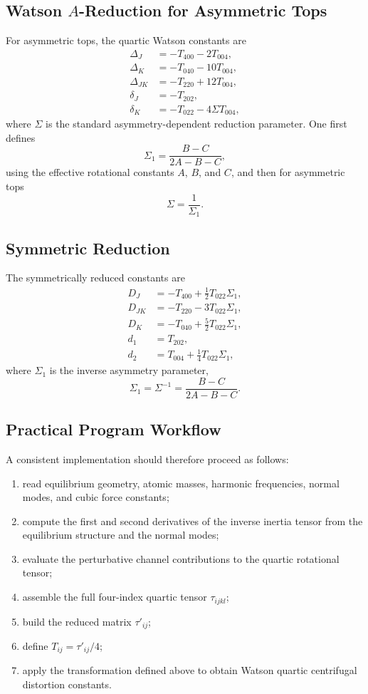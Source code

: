 \documentclass[11pt]{article}
\begin{document}
\subsection{Watson $A$-Reduction for Asymmetric Tops}
For asymmetric tops, the quartic Watson constants are
\begin{align}
\Delta_J   &= -T_{400}-2T_{004},\\
\Delta_K   &= -T_{040}-10T_{004},\\
\Delta_{JK}&= -T_{220}+12T_{004},\\
\delta_J   &= -T_{202},\\
\delta_K   &= -T_{022}-4\Sigma T_{004},
\end{align}
where $\Sigma$ is the standard asymmetry-dependent reduction parameter. One first defines
\begin{equation}
\Sigma_1 = \frac{B-C}{2A-B-C},
\end{equation}
using the effective rotational constants \(A\), \(B\), and \(C\), and then for asymmetric tops
\begin{equation}
\Sigma = \frac{1}{\Sigma_1}.
\end{equation}

\subsection{Symmetric Reduction}
The symmetrically reduced constants are
\begin{align}
D_J   &= -T_{400}+\frac{1}{2}T_{022}\Sigma_1,\\
D_{JK}&= -T_{220}-3T_{022}\Sigma_1,\\
D_K   &= -T_{040}+\frac{5}{2}T_{022}\Sigma_1,\\
d_1   &= T_{202},\\
d_2   &= T_{004}+\frac{1}{4}T_{022}\Sigma_1,
\end{align}
where $\Sigma_1$ is the inverse asymmetry parameter,
\[
\Sigma_1=\Sigma^{-1}=\frac{B-C}{2A-B-C}.
\]

\subsection{Practical Program Workflow}
A consistent implementation should therefore proceed as follows:
\begin{enumerate}
\item read equilibrium geometry, atomic masses, harmonic frequencies, normal modes, and cubic force constants;
\item compute the first and second derivatives of the inverse inertia tensor from the equilibrium structure and the normal modes;
\item evaluate the perturbative channel contributions to the quartic rotational tensor;
\item assemble the full four-index quartic tensor $\tau_{ijkl}$;
\item build the reduced matrix $\tau'_{ij}$;
\item define $T_{ij}=\tau'_{ij}/4$;
\item apply the transformation defined above to obtain Watson quartic centrifugal distortion constants.
\end{enumerate}
\end{document}
